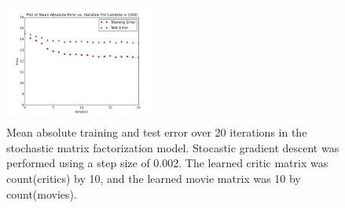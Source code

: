 \documentclass[12pt]{article}
\newcommand{\factwidth}{0.44}
\newcommand{\factheight}{1.6in}
\begin{document}
\begin{figure}[H]
\includegraphics[width=0\factwidth\textwidth,height=\factheight]{matrix_plots/test-i40d10l1000.png}
\caption{Mean absolute training and test error over 20 iterations in the stochastic matrix factorization model. Stocastic gradient descent was performed using a step size of 0.002. The learned critic matrix was count(critics) by 10, and the learned movie matrix was 10 by count(movies).}
\label{fig:fac-d10}
\end{figure}
\end{document}
